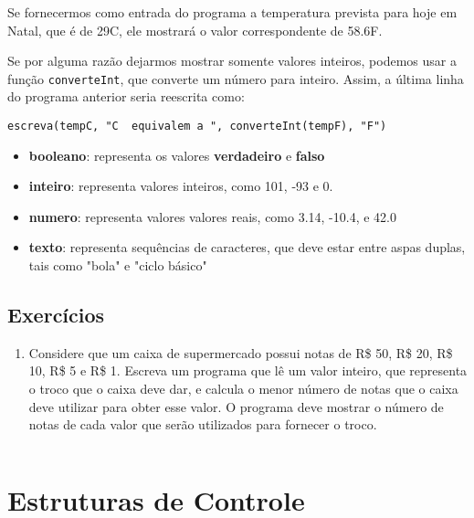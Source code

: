 \documentclass{report}
\begin{document}
Se fornecermos como entrada do programa a temperatura prevista para hoje em Natal,
que é de 29\degree C, ele mostrará o valor correspondente de 58.6\degree F.

Se por alguma razão dejarmos mostrar somente valores inteiros, podemos usar a função
\texttt{converteInt}, que converte um número para inteiro. Assim, a última linha do
programa anterior seria reescrita como:
\begin{verbatim}
escreva(tempC, "C  equivalem a ", converteInt(tempF), "F")
\end{verbatim}

\begin{itemize}
	\item \textbf{booleano}: representa os valores \textbf{verdadeiro} e \textbf{falso}
	\item \textbf{inteiro}: representa valores inteiros, como 101, -93 e 0.
	\item \textbf{numero}: representa valores valores reais, como 3.14, -10.4, e 42.0
	\item \textbf{texto}: representa sequências de caracteres, que deve estar entre
  aspas duplas, tais como "bola" e "ciclo básico"
\end{itemize}







\section{Exercícios}

\begin{enumerate}

\item Considere que um caixa de supermercado possui notas de R\$ 50,
R\$ 20, R\$ 10, R\$ 5 e R\$ 1. Escreva um programa que lê um valor
inteiro, que representa o troco que o caixa deve dar, e calcula o
menor número de notas que o caixa deve utilizar para obter esse valor.
O programa deve mostrar o número de notas de cada valor que serão
utilizados para fornecer o troco.

\begin{verbatim}

\end{verbatim}


\end{enumerate}


\chapter{Estruturas de Controle}
\end{document}
